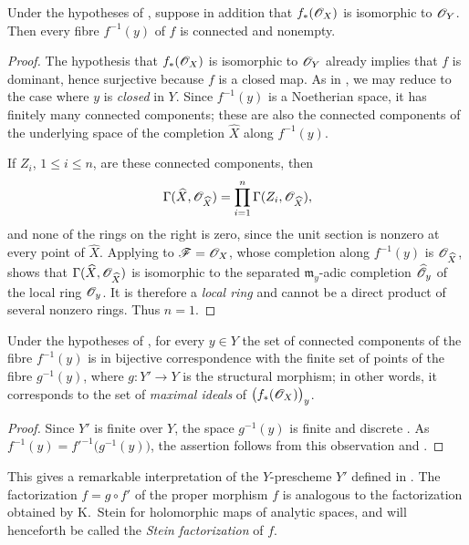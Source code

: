 \begin{corollary}[4.3.2]
\label{III.4.3.2}
Under the hypotheses of , suppose in addition that
$f_*(\mathscr{O}_X)$ is isomorphic to $\mathscr{O}_Y$.  Then every fibre
$f^{-1}(y)$ of $f$ is connected and nonempty.
\end{corollary}

\begin{proof}
The hypothesis that $f_*(\mathscr{O}_X)$ is isomorphic to $\mathscr{O}_Y$
already implies that $f$ is dominant, hence surjective because $f$
is a closed map.  As in , we may reduce to the case
where $y$ is \emph{closed} in $Y$.  Since $f^{-1}(y)$ is a Noetherian
space, it has finitely many connected components; these are also the
connected components of the underlying space of the completion
$\widehat{X}$ along $f^{-1}(y)$.

If $Z_i$, $1\leq i\leq n$, are these connected components, then
\[
  \Gamma(\widehat{X},\mathscr{O}_{\widehat{X}})
  =
  \prod_{i=1}^{n}\Gamma(Z_i,\mathscr{O}_{\widehat{X}}),
\]
and none of the rings on the right is zero, since the unit section is
nonzero at every point of $\widehat{X}$.  Applying
 to $\mathscr{F}=\mathscr{O}_X$, whose completion along
$f^{-1}(y)$ is $\mathscr{O}_{\widehat{X}}$, shows that
$\Gamma(\widehat{X},\mathscr{O}_{\widehat{X}})$ is isomorphic to the
separated $\mathfrak{m}_y$-adic completion
$\widehat{\mathscr{O}}_y$ of the local ring $\mathscr{O}_y$.  It is therefore
a \emph{local ring} and cannot be a direct product of several nonzero rings.
Thus $n=1$.
\end{proof}

\begin{corollary}[4.3.3]
\label{III.4.3.3}
Under the hypotheses of , for every $y\in Y$ the set
of connected components of the fibre $f^{-1}(y)$ is in bijective
correspondence with the finite set of points of the fibre
$g^{-1}(y)$, where $g:Y'\to Y$ is the structural morphism; in other
words, it corresponds to the set of \emph{maximal ideals} of
$\bigl(f_*(\mathscr{O}_X)\bigr)_y$.
\end{corollary}

\begin{proof}
Since $Y'$ is finite over $Y$, the space $g^{-1}(y)$ is finite and
discrete .  As $f^{-1}(y)=f'^{-1}\bigl(g^{-1}(y)\bigr)$,
the assertion follows from this observation and
.
\end{proof}

This gives a remarkable interpretation of the $Y$-prescheme $Y'$
defined in .  The factorization
$f=g\circ f'$ of the proper morphism $f$ is analogous to the
factorization obtained by K.~Stein for holomorphic maps of analytic
spaces, and will henceforth be called the \emph{Stein factorization}
of $f$.

